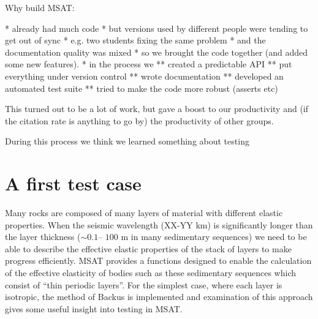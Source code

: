 \documentclass[11pt, oneside]{article}   	%
\begin{document}
Why build MSAT:

* already had much code
* but versions used by different people were tending to get out of sync
* e.g. two students fixing the same problem
* and the documentation quality was mixed
* so we brought the code together (and added some new features).
* in the process we
** created a predictable API
** put everything under version control
** wrote documentation
** developed an automated test suite
** tried to make the code more robust (asserts etc)

This turned out to be a lot of work, but gave a boost to our productivity and 
(if the citation rate is anything to go by) the productivity of other groups.

During this process we think we learned something about testing

\section{A first test case}

Many rocks are composed of many layers of material with different elastic properties. When
the seismic wavelength (XX-YY km) is significantly longer than the layer thickness ($\sim0.1$--
$100$ m in many sedimentary sequences) we need to be able to describe the effective elastic
properties of the stack of layers to make progress efficiently. MSAT provides a functions designed
to enable the calculation of the effective elasticity of bodies such as these sedimentary sequences
which consist of ``thin periodic layers''. For the simplest case, where each layer is isotropic, the 
method of Backus \cite{Backus1962} is implemented and examination of this approach gives some
useful insight into testing in MSAT.
\end{document}
